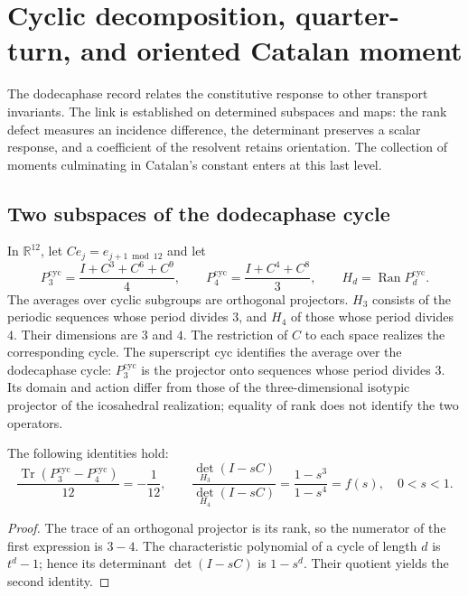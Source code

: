 \section{Cyclic decomposition, quarter-turn, and oriented Catalan moment}
\label{iii:sec:catalan}

The dodecaphase record relates the constitutive response to
other transport invariants. The link is established on determined subspaces
and maps: the rank defect measures an incidence difference,
the determinant preserves a scalar response, and a coefficient
of the resolvent retains orientation. The collection of moments culminating
in Catalan's constant enters at this last level.

\subsection{Two subspaces of the dodecaphase cycle}

In $\mathbb R^{12}$, let $C e_j=e_{j+1\bmod12}$ and let
\begin{equation}
 P_3^{\mathrm{cyc}}=\frac{I+C^3+C^6+C^9}{4},\qquad
 P_4^{\mathrm{cyc}}=\frac{I+C^4+C^8}{3},\qquad
 H_d=\operatorname{Ran}P_d^{\mathrm{cyc}}.
 \label{iii:eq:projectors34}
\end{equation}
The averages over cyclic subgroups are orthogonal projectors.
$H_3$ consists of the periodic sequences whose period divides $3$,
and $H_4$ of those whose period divides $4$. Their dimensions are $3$ and $4$.
The restriction of $C$ to each space realizes the corresponding cycle.
The superscript $\mathrm{cyc}$ identifies the average over the dodecaphase cycle:
$P_3^{\mathrm{cyc}}$ is the projector onto sequences whose period divides
$3$. Its domain and action differ from those of the three-dimensional
isotypic projector of the icosahedral realization; equality of rank
does not identify the two operators.

\begin{proposition}
The following identities hold:
\begin{equation}
 \frac{\operatorname{Tr}(P_3^{\mathrm{cyc}}-P_4^{\mathrm{cyc}})}{12}=-\frac1{12},\qquad
 \frac{\det_{H_3}(I-sC)}{\det_{H_4}(I-sC)}
 =\frac{1-s^3}{1-s^4}=f(s),\quad 0<s<1.
 \label{iii:eq:trace-det}
\end{equation}
\end{proposition}
\begin{proof}
The trace of an orthogonal projector is its rank, so the numerator
of the first expression is $3-4$. The characteristic polynomial of a cycle
of length $d$ is $t^d-1$; hence its determinant $\det(I-sC)$ is
$1-s^d$. Their quotient yields the second identity.
\end{proof}

